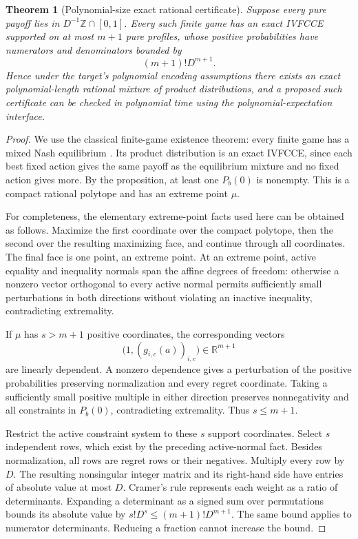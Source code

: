\documentclass[11pt]{article}
\newtheorem{theorem}{Theorem}
\theoremstyle{definition}
\newcommand{\R}{\mathbb R}
\begin{document}
\begin{theorem}[Polynomial-size exact rational certificate]
Suppose every pure payoff lies in $D^{-1}\mathbb Z\cap[0,1]$. Every such finite game has an exact IVFCCE supported on at most $m+1$ pure profiles, whose positive probabilities have numerators and denominators bounded by
\[
 (m+1)!D^{m+1}.
\]
Hence under the target's polynomial encoding assumptions there exists an exact polynomial-length rational mixture of product distributions, and a proposed such certificate can be checked in polynomial time using the polynomial-expectation interface.
\end{theorem}
\begin{proof}
We use the classical finite-game existence theorem: every finite game has a mixed Nash equilibrium \cite{nash}. Its product distribution is an exact IVFCCE, since each best fixed action gives the same payoff as the equilibrium mixture and no fixed action gives more. By the proposition, at least one $P_b(0)$ is nonempty. This is a compact rational polytope and has an extreme point $\mu$.

For completeness, the elementary extreme-point facts used here can be obtained as follows. Maximize the first coordinate over the compact polytope, then the second over the resulting maximizing face, and continue through all coordinates. The final face is one point, an extreme point. At an extreme point, active equality and inequality normals span the affine degrees of freedom: otherwise a nonzero vector orthogonal to every active normal permits sufficiently small perturbations in both directions without violating an inactive inequality, contradicting extremality.

If $\mu$ has $s>m+1$ positive coordinates, the corresponding vectors
\[
 \bigl(1,(g_{i,c}(a))_{i,c}\bigr)\in\R^{m+1}
\]
are linearly dependent. A nonzero dependence gives a perturbation of the positive probabilities preserving normalization and every regret coordinate. Taking a sufficiently small positive multiple in either direction preserves nonnegativity and all constraints in $P_b(0)$, contradicting extremality. Thus $s\le m+1$.

Restrict the active constraint system to these $s$ support coordinates. Select $s$ independent rows, which exist by the preceding active-normal fact. Besides normalization, all rows are regret rows or their negatives. Multiply every row by $D$. The resulting nonsingular integer matrix and its right-hand side have entries of absolute value at most $D$. Cramer's rule represents each weight as a ratio of determinants. Expanding a determinant as a signed sum over permutations bounds its absolute value by $s!D^s\le(m+1)!D^{m+1}$. The same bound applies to numerator determinants. Reducing a fraction cannot increase the bound.


\end{proof}
\end{document}

